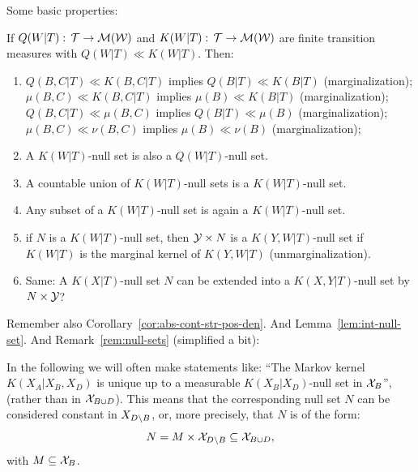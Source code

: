 Some basic properties:
\begin{Lem}
  If $Q(W|T):\, \mathcal{T} \to \mathcal{M}(\mathcal{W})$ and $K(W|T):\, \mathcal{T} \to \mathcal{M}(\mathcal{W})$ are finite transition measures with $Q(W|T) \ll K(W|T)$. 
  Then:
  \begin{enumerate}
    \item $Q(B,C|T) \ll K(B,C|T)$ implies $Q(B|T) \ll K(B|T)$ (marginalization);\\
      $\mu(B,C) \ll K(B,C|T)$ implies $\mu(B) \ll K(B|T)$ (marginalization);\\
      $Q(B,C|T) \ll \mu(B,C)$ implies $Q(B|T) \ll \mu(B)$ (marginalization);\\
      $\mu(B,C) \ll \nu(B,C)$ implies $\mu(B) \ll \nu(B)$ (marginalization);
    \item A $K(W|T)$-null set is also a $Q(W|T)$-null set.
    \item A countable union of $K(W|T)$-null sets is a $K(W|T)$-null set.
    \item Any subset of a $K(W|T)$-null set is again a $K(W|T)$-null set.
    \item if $N$ is a $K(W|T)$-null set, then $\mathcal{Y} \times N$ is a $K(Y,W|T)$-null set if $K(W|T)$ is the marginal kernel of $K(Y,W|T)$ (unmarginalization).
    \item Same: A $K(X|T)$-null set $N$ can be extended into a $K(X,Y|T)$-null set by $N \times \mathcal{Y}$?
  \end{enumerate}
\end{Lem}
Remember also Corollary~\ref{cor:abs-cont-str-pos-den}.
And Lemma~\ref{lem:int-null-set}.
And Remark~\ref{rem:null-sets} (simplified a bit):
\begin{Rem}
  In the following we will often make statements like:
  ``The Markov kernel $K(X_A|X_B,X_D)$ is unique up to a measurable $K(X_B|X_D)$-null set in $\mathcal{X}_B$'',  (rather than in $\mathcal{X}_{B \cup D}$). 
  This means that the corresponding null set $N$ can be considered constant in $X_{D \setminus B}$, or, more precisely, 
  that $N$ is of the form:
  \[ N = M \times \mathcal{X}_{D \setminus B}  \subseteq \mathcal{X}_{B \cup D},  \]
  with $M \subseteq \mathcal{X}_B$.
\end{Rem}
